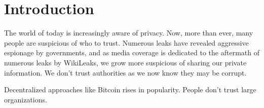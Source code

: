 \chapter{Introduction}\label{cha:introduction}

The world of today is increasingly aware of privacy. Now, more than ever, many people are suspicious of who to trust. Numerous leaks have revealed aggressive espionage by governments, and as media coverage is dedicated to the aftermath of numerous leaks by WikiLeaks, we grow more suspicious of sharing our private information. We don't trust authorities as we now know they may be corrupt.

Decentralized approaches like Bitcoin rises in popularity. People don't trust large organizations.




